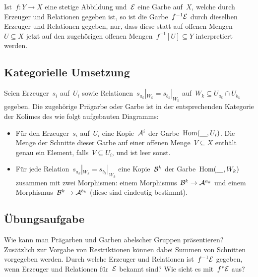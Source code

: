\documentclass{uebblatt}
\begin{document}
Ist~$f : Y \to X$ eine stetige Abbildung und~$\mathcal{E}$ eine Garbe auf~$X$, welche
durch Erzeuger und Relationen gegeben ist, so ist die Garbe~$f^{-1}\mathcal{E}$ durch
dieselben Erzeuger und Relationen gegeben, nur, dass diese statt auf offenen
Mengen~$U \subseteq X$ jetzt auf den zugehörigen offenen Mengen~$f^{-1}[U]
\subseteq Y$ interpretiert werden.


\subsection*{Kategorielle Umsetzung}

Seien Erzeuger~$s_i$ auf~$U_i$ sowie Relationen~$s_{a_k}|_{W_k} =
s_{b_k}|_{W_k}$ auf~$W_k \subseteq U_{a_k} \cap U_{b_k}$ gegeben. Die
zugehörige Prägarbe oder Garbe ist in der entsprechenden Kategorie der Kolimes
des wie folgt aufgebauten Diagramms:

\begin{itemize}
\item Für den Erzeuger~$s_i$ auf~$U_i$ eine Kopie~$\mathcal{A}^i$ der
Garbe~$\mathrm{Hom}(\underline{\quad},U_i)$. Die Menge der Schnitte dieser Garbe auf einer
offenen Menge~$V \subseteq X$ enthält genau ein Element, falls~$V \subseteq
U_i$, und ist leer sonst.
\item Für jede Relation~$s_{a_k}|_{W_k} =
s_{b_k}|_{W_k}$ eine Kopie~$\mathcal{B}^k$ der Garbe~$\mathrm{Hom}(\underline{\quad},W_k)$ zusammen
mit zwei Morphismen: einem Morphismus~$\mathcal{B}^k \to \mathcal{A}^{a_k}$ und einem
Morphismus~$\mathcal{B}^k \to \mathcal{A}^{b_k}$ (diese sind eindeutig bestimmt).
\end{itemize}


\subsection*{Übungsaufgabe}

Wie kann man Prägarben und Garben abelscher Gruppen präsentieren? Zusätzlich
zur Vorgabe von Restriktionen können dabei Summen von Schnitten vorgegeben
werden. Durch welche Erzeuger und Relationen ist~$f^{-1} \mathcal{E}$ gegeben, wenn
Erzeuger und Relationen für~$\mathcal{E}$ bekannt sind? Wie sieht es mit~$f^* \mathcal{E}$ aus?
\end{document}
